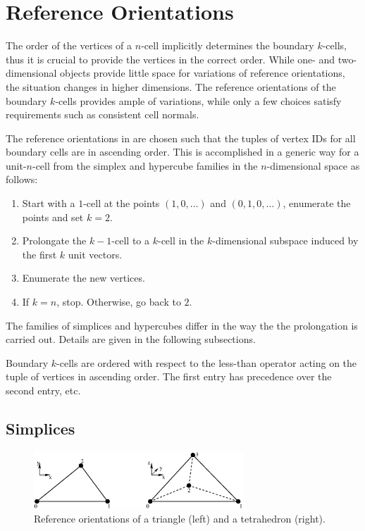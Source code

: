 \chapter{Reference Orientations} \label{chap:orientations}

The order of the vertices of a $n$-cell implicitly determines the boundary $k$-cells,
thus it is crucial to provide the vertices in the correct order.
While one- and two-dimensional objects provide little space for variations of reference orientations,
the situation changes in higher dimensions. The reference orientations
of the boundary $k$-cells provides ample of variations, while only a few choices
satisfy requirements such as consistent cell normals.

The reference orientations in {\ViennaGrid} are chosen such that the tuples
of vertex IDs for all boundary cells are in ascending order. This is accomplished
in a generic way for a unit-$n$-cell from the simplex and hypercube families in the $n$-dimensional space as follows:
\begin{enumerate}
 \item Start with a $1$-cell at the points $(1, 0, \ldots)$ and $(0, 1, 0, \ldots)$, enumerate the points and set $k=2$.
 \item Prolongate the $k-1$-cell to a $k$-cell in the $k$-dimensional subspace induced by the first $k$ unit vectors.
 \item Enumerate the new vertices.
 \item If $k=n$, stop. Otherwise, go back to $2$.
\end{enumerate}

The families of simplices and hypercubes differ in the way the the prolongation is carried out.
Details are given in the following subsections.

Boundary $k$-cells are ordered with respect to the less-than operator acting on the tuple of vertices in ascending order.
The first entry has precedence over the second entry, etc.

\section{Simplices}
\begin{figure}[tb]
\centering
 \includegraphics[width=0.7\textwidth]{figures/orientation-simplex.eps}
 \caption{Reference orientations of a triangle (left) and a tetrahedron (right).}
 \label{fig:orientation-simplex}
\end{figure}

